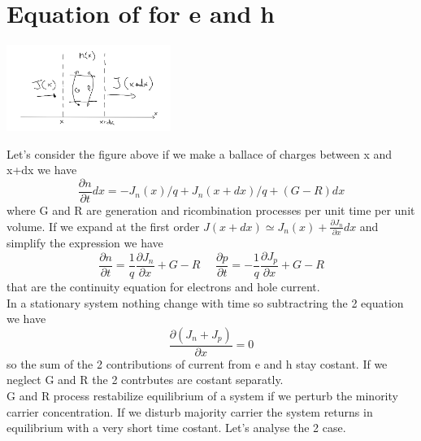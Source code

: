 \section{Equation of for e and h}

\centering
\includegraphics[width=0.4\textwidth]{continuityeq.png}\\
\raggedright

Let's consider the figure above if we make a ballace of charges between x and x+dx we have 
\begin{equation}
\frac{\partial n}{\partial t}dx=-J_n(x)/q+J_n(x+dx)/q+(G-R)dx
\end{equation}
where G and R are generation and ricombination processes per unit time per unit volume. If we expand at the first order $J(x+dx)\simeq J_n(x)+\frac{\partial J_n}{\partial x}dx $ and simplify the expression we have
\begin{equation}
\frac{\partial n}{\partial t}=\frac{1}{q}\frac{\partial J_n}{\partial x}+G-R \ \ \ \ \ \ \frac{\partial p}{\partial t}=-\frac{1}{q}\frac{\partial J_p}{\partial x}+G-R
\end{equation}
that are the continuity equation for electrons and hole current.\\
In a stationary system nothing change with time so subtractring the 2 equation we have 
\begin{equation}
\frac{\partial(J_n+J_p)}{\partial x}=0
\end{equation}
so the sum of the 2 contributions of current from e and h stay costant. If we neglect G and R the 2 contrbutes are costant separatly.\\
G and R process restabilize equilibrium of a system if we perturb the minority carrier concentration. If we disturb majority carrier the system returns in equilibrium with a very short time costant.
Let's analyse the 2 case.\\ 

